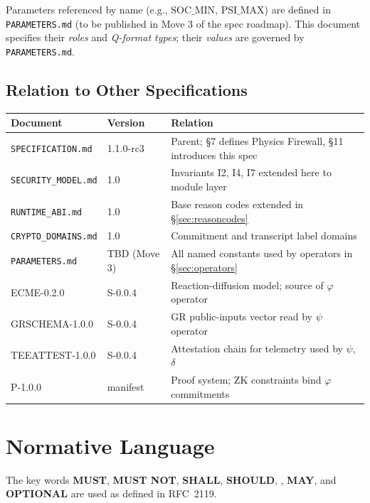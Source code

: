 \documentclass[11pt,letterpaper]{article}
\theoremstyle{definition}
\newcommand{\MUST}{\textbf{MUST}}
\newcommand{\MUSTNOT}{\textbf{MUST NOT}}
\newcommand{\SHALL}{\textbf{SHALL}}
\newcommand{\SHOULD}{\textbf{SHOULD}}
\newcommand{\MAY}{\textbf{MAY}}
\newcommand{\ph}{\varphi}       %
\newcommand{\sy}{\psi}          %
\newcommand{\dv}{\delta}        %
\begin{document}
\noindent Parameters referenced by name (e.g., $\mathrm{SOC\_MIN}$, $\mathrm{PSI\_MAX}$) are defined in \texttt{PARAMETERS.md} (to be published in Move 3 of the spec roadmap). This document specifies their \emph{roles} and \emph{Q-format types}; their \emph{values} are governed by \texttt{PARAMETERS.md}.

\subsection{Relation to Other Specifications}

\begin{center}
\begin{tabular}{lll}
\toprule
\textbf{Document} & \textbf{Version} & \textbf{Relation} \\
\midrule
\texttt{SPECIFICATION.md} & 1.1.0-rc3 & Parent; §7 defines Physics Firewall, §11 introduces this spec \\
\texttt{SECURITY\_MODEL.md} & 1.0 & Invariants I2, I4, I7 extended here to module layer \\
\texttt{RUNTIME\_ABI.md} & 1.0 & Base reason codes extended in §\ref{sec:reasoncodes} \\
\texttt{CRYPTO\_DOMAINS.md} & 1.0 & Commitment and transcript label domains \\
\texttt{PARAMETERS.md} & TBD (Move 3) & All named constants used by operators in §\ref{sec:operators} \\
ECME-0.2.0 & S-0.0.4 & Reaction-diffusion model; source of $\ph$ operator \\
GRSCHEMA-1.0.0 & S-0.0.4 & GR public-inputs vector read by $\sy$ operator \\
TEEATTEST-1.0.0 & S-0.0.4 & Attestation chain for telemetry used by $\sy$, $\dv$ \\
P-1.0.0 & manifest & Proof system; ZK constraints bind $\ph$ commitments \\
\bottomrule
\end{tabular}
\end{center}

\section{Normative Language}
\label{sec:normlang}

The key words \MUST{}, \MUSTNOT{}, \SHALL{}, \SHOULD{}, \RECOMMENDED{}, \MAY{}, and \textbf{OPTIONAL} are used as defined in RFC~2119.
\end{document}
